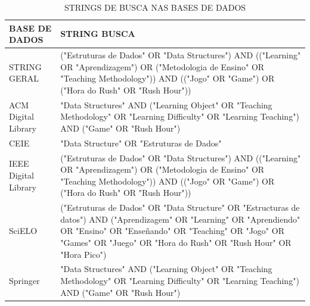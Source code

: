 \documentclass[12pt]{article}
\begin{document}
\begin{table}[h]
    \centering

    \caption{STRINGS DE BUSCA NAS BASES DE DADOS}
    \label{fig:stringBuscaBase}
    \begin{tabular}{|p{2cm}|p{10cm}|}
        \hline
        BASE DE DADOS        & STRING BUSCA                                                                                                                                                                                                                                       \\
        \hline
        STRING GERAL         & ("Estruturas de Dados" OR "Data Structures") AND (("Learning" OR "Aprendizagem") OR ("Metodologia de Ensino" OR "Teaching Methodology")) AND (("Jogo" OR "Game") OR ("Hora do Rush" OR "Rush Hour"))                                               \\
        \hline
        ACM Digital Library  & "Data Structures" AND ("Learning Object" OR "Teaching Methodology" OR "Learning Difficulty" OR "Learning Teaching") AND ("Game" OR "Rush Hour")                                                                                                    \\
        \hline
        CEIE                 & "Data Structure" OR "Estruturas de Dados"                                                                                                                                                                                                          \\
        \hline
        IEEE Digital Library & ("Estruturas de Dados" OR "Data Structures") AND (("Learning" OR "Aprendizagem") OR ("Metodologia de Ensino" OR "Teaching Methodology")) AND (("Jogo" OR "Game") OR ("Hora do Rush" OR "Rush Hour"))                                               \\
        \hline
        SciELO               & ("Estruturas de Dados" OR "Data Structure" OR "Estructuras de datos") AND ("Aprendizagem" OR "Learning" OR "Aprendiendo" OR "Ensino" OR "Enseñando" OR "Teaching" OR "Jogo" OR "Games" OR "Juego" OR "Hora do Rush" OR "Rush Hour" OR "Hora Pico") \\
        \hline
        Springer             & "Data Structures" AND ("Learning Object" OR "Teaching Methodology" OR "Learning Difficulty" OR "Learning Teaching") AND ("Game" OR "Rush Hour")                                                                                                    \\
        \hline
    \end{tabular}

\end{table}
\end{document}
